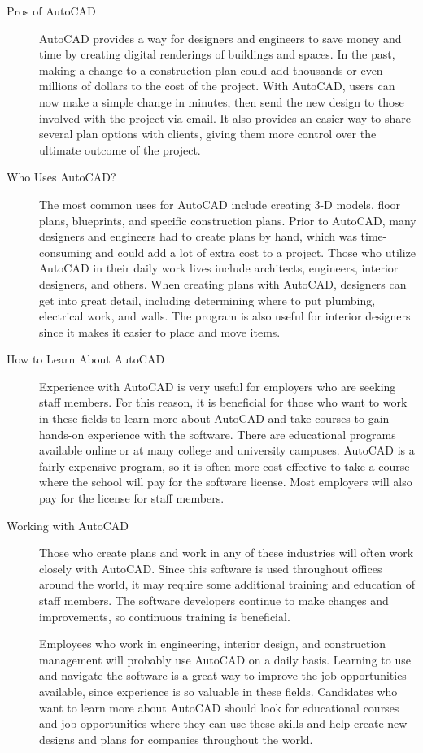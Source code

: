\documentclass[a4paper,10pt,french]{sphinxmanual}
\begin{document}
\begin{description}
\item[{Pros of AutoCAD}] \leavevmode
AutoCAD provides a way for designers and engineers to save money and time by creating digital renderings of buildings and spaces. In the past, making a change to a construction plan could add thousands or even millions of dollars to the cost of the project. With AutoCAD, users can now make a simple change in minutes, then send the new design to those involved with the project via email. It also provides an easier way to share several plan options with clients, giving them more control over the ultimate outcome of the project.

\item[{Who Uses AutoCAD?}] \leavevmode
The most common uses for AutoCAD include creating 3-D models, floor plans, blueprints, and specific construction plans. Prior to AutoCAD, many designers and engineers had to create plans by hand, which was time-consuming and could add a lot of extra cost to a project. Those who utilize AutoCAD in their daily work lives include architects, engineers, interior designers, and others. When creating plans with AutoCAD, designers can get into great detail, including determining where to put plumbing, electrical work, and walls. The program is also useful for interior designers since it makes it easier to place and move items.

\item[{How to Learn About AutoCAD}] \leavevmode
Experience with AutoCAD is very useful for employers who are seeking staff members. For this reason, it is beneficial for those who want to work in these fields to learn more about AutoCAD and take courses to gain hands-on experience with the software. There are educational programs available online or at many college and university campuses. AutoCAD is a fairly expensive program, so it is often more cost-effective to take a course where the school will pay for the software license. Most employers will also pay for the license for staff members.

\item[{Working with AutoCAD}] \leavevmode
Those who create plans and work in any of these industries will often work closely with AutoCAD. Since this software is used throughout offices around the world, it may require some additional training and education of staff members. The software developers continue to make changes and improvements, so continuous training is beneficial.

Employees who work in engineering, interior design, and construction management will probably use AutoCAD on a daily basis. Learning to use and navigate the software is a great way to improve the job opportunities available, since experience is so valuable in these fields. Candidates who want to learn more about AutoCAD should look for educational courses and job opportunities where they can use these skills and help create new designs and plans for companies throughout the world.

\end{description}
\end{document}
